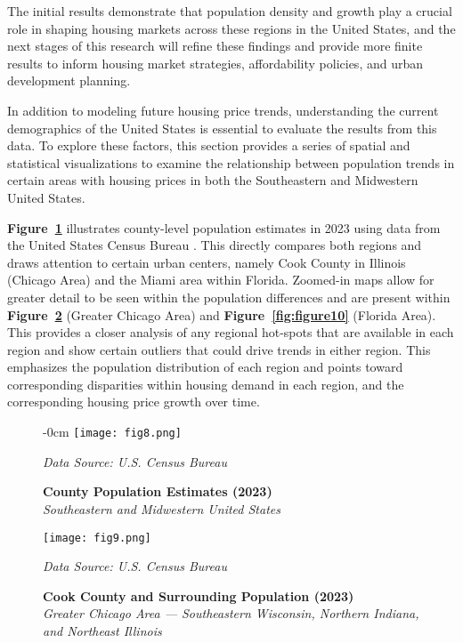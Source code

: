 \documentclass[journal,article,submit,pdftex,moreauthors]{Definitions/mdpi}
\begin{document}
The initial results demonstrate that population density and growth play a crucial role in shaping housing markets across these regions in the United States, and the next stages of this research will refine these findings and provide more finite results to inform housing market strategies, affordability policies, and urban development planning.

In addition to modeling future housing price trends, understanding the current demographics of the United States is essential to evaluate the results from this data. To explore these factors, this section provides a series of spatial and statistical visualizations to examine the relationship between population trends in certain areas with housing prices in both the Southeastern and Midwestern United States.

\textbf{Figure~\ref{fig:figure8}} illustrates county-level population estimates in 2023 using data from the United States Census Bureau \citep{_2023_county}. This directly compares both regions and draws attention to certain urban centers, namely Cook County in Illinois (Chicago Area) and the Miami area within Florida. Zoomed-in maps allow for greater detail to be seen within the population differences and are present within \textbf{Figure~\ref{fig:figure9}} (Greater Chicago Area) and \textbf{Figure~\ref{fig:figure10}} (Florida Area). This provides a closer analysis of any regional hot-spots that are available in each region and show certain outliers that could drive trends in either region. This emphasizes the population distribution of each region and points toward corresponding disparities within housing demand in each region, and the corresponding housing price growth over time.


\begin{figure}[H]
  \begin{adjustwidth}{-\extralength}{0cm}
    \centering
    \texttt{[image: fig8.png]}
    \caption{\textbf{County Population Estimates (2023)}\\\textit{Southeastern and Midwestern United States}}
    \label{fig:figure8}
    \vspace{1ex}
    {\footnotesize\textit{Data Source: U.S. Census Bureau}}
  \end{adjustwidth}
\end{figure}

\begin{figure}[H]
  \centering
  \texttt{[image: fig9.png]}
  \caption{\textbf{Cook County and Surrounding Population (2023)}\\\textit{Greater Chicago Area — Southeastern Wisconsin, Northern Indiana, and Northeast Illinois}}
  \label{fig:figure9}
  \vspace{1ex}
  {\footnotesize\textit{Data Source: U.S. Census Bureau}}
\end{figure}
\end{document}
